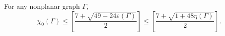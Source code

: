 For any nonplanar graph $\Gamma$,
$$\chi_0(\Gamma) \leq \left[ \frac{7 + \sqrt{49 - 24\varepsilon(\Gamma)}}{2} \right] \leq \left[ \frac{7 + \sqrt{1 + 48\eta(\Gamma)}}{2} \right].$$
